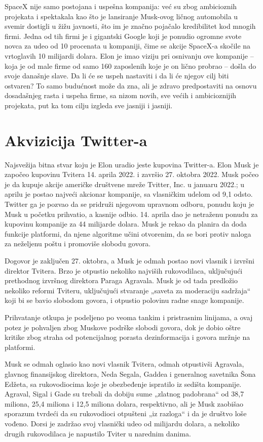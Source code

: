 \documentclass[a4paper,11pt]{article}
\begin{document}
SpaceX nije samo postojana i uspešna kompanija: već su zbog ambicioznih projekata i spektakala kao što je lansiranje Musk-ovog ličnog automobila u svemir dostigli u žižu javnosti, što im je značno pojačalo kredibilitet kod mnogih firmi. Jedna od tih firmi je i gigantski Google koji je ponudio ogromne svote novca za udeo od 10 procenata u kompaniji, čime se akcije SpaceX-a skočile na vrtoglavih 10 milijardi dolara. Elon je imao viziju pri osnivanju ove kompanije – koja je od male firme od samo 160 zaposlenih koje je on lično probrao – došla do svoje današnje slave. Da li će se uspeh nastaviti i da li će njegov cilj biti ostvaren? To samo budućnost može da zna, ali je zdravo predpostaviti na osnovu dosadašnjeg rasta i uspeha firme, sa nizom novih, sve većih i ambicioznijih projekata, put ka tom cilju izgleda sve jasniji i jasniji.


\section{Akvizicija Twitter-a}
\label{sec:Akvizicija Twitter-a}


Najsvežija bitna stvar koju je Elon uradio jeste kupovina Twitter-a. Elon Musk je započeo kupovinu Tvitera 14. aprila 2022. i završio 27. oktobra 2022. Musk počeo je da kupuje akcije američke društvene mreže Tvitter, Inc. u januaru 2022.; u aprilu je postao najveći akcionar kompanije, sa vlasničkim udelom od 9,1 odsto. Twitter ga je pozvao da se pridruži njegovom upravnom odboru, ponudu koju je Musk u početku prihvatio, a kasnije odbio. 14. aprila dao je netraženu ponudu za kupovinu kompanije za 44 milijarde dolara. Musk je rekao da planira da doda funkcije platformi, da njene algoritme učini otvorenim, da se bori protiv naloga za neželjenu poštu i promoviše slobodu govora.

Dogovor je zaključen 27. oktobra, a Musk je odmah postao novi vlasnik i izvršni direktor Tvitera. Brzo je otpustio nekoliko najviših rukovodilaca, uključujući prethodnog izvršnog direktora Paraga Agravala. Musk je od tada predložio nekoliko reformi Tviteru, uključujući stvaranje „saveta za moderaciju sadržaja“ koji bi se bavio slobodom govora, i otpustio polovinu radne snage kompanije.

Prihvatanje otkupa je podeljeno po veoma tankim i pristrasnim linijama, a ovaj potez je pohvaljen zbog Muskove podrške slobodi govora, dok je dobio oštre kritike zbog straha od potencijalnog porasta dezinformacija i govora mržnje na platformi. 

Musk se odmah oglasio kao novi vlasnik Tvitera, odmah otpustivši Agravala, glavnog finansijskog direktora, Neda Segala, Gaddea i generalnog savetnika Šona Edžeta, sa rukovodiocima koje je obezbeđenje ispratilo iz sedišta kompanije. Agraval, Sigal i Gade su trebali da dobiju sume „zlatnog padobrana“ od 38,7 miliona, 25,4 miliona i 12,5 miliona dolara, respektivno, ali je Musk zaobišao sporazum tvrdeći da su rukovodioci otpušteni „iz razloga“ i da je društvo loše vođeno. Dorsi je zadržao svoj vlasnički udeo od milijardu dolara, a nekoliko drugih rukovodilaca je napustilo Tviter u narednim danima.
\end{document}
